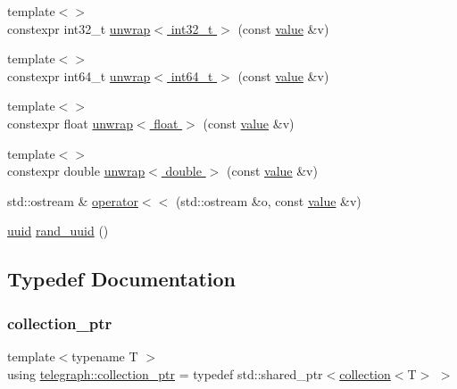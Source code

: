 \begin{DoxyCompactItemize}
\item 
{\footnotesize template$<$$>$ }\\constexpr int32\+\_\+t \hyperlink{namespacetelegraph_adbd7808475a7100a0b36ac829ffed4bf}{unwrap$<$ int32\+\_\+t $>$} (const \hyperlink{classtelegraph_1_1value}{value} \&v)
\item 
{\footnotesize template$<$$>$ }\\constexpr int64\+\_\+t \hyperlink{namespacetelegraph_abd6af2f3c5810ce849af3b37bbf8287a}{unwrap$<$ int64\+\_\+t $>$} (const \hyperlink{classtelegraph_1_1value}{value} \&v)
\item 
{\footnotesize template$<$$>$ }\\constexpr float \hyperlink{namespacetelegraph_afb450fb07065bff298f2304d9cf5c087}{unwrap$<$ float $>$} (const \hyperlink{classtelegraph_1_1value}{value} \&v)
\item 
{\footnotesize template$<$$>$ }\\constexpr double \hyperlink{namespacetelegraph_a714db222bc5b74579bd2d0c5dbd0e6d1}{unwrap$<$ double $>$} (const \hyperlink{classtelegraph_1_1value}{value} \&v)
\item 
std\+::ostream \& \hyperlink{namespacetelegraph_af98f82e1c03798a66c7905e7ae17c5c0}{operator$<$$<$} (std\+::ostream \&o, const \hyperlink{classtelegraph_1_1value}{value} \&v)
\item 
\hyperlink{namespacetelegraph_a51ee91d7eaeef067f7ccac2b170e5d59}{uuid} \hyperlink{namespacetelegraph_aba245ee65da02fc6a1ff4b055d460598}{rand\+\_\+uuid} ()
\end{DoxyCompactItemize}


\subsection{Typedef Documentation}
\mbox{\label{namespacetelegraph_a4fa3678b3fd260dc79a98bea50d582fd}} 
\subsubsection{\texorpdfstring{collection\+\_\+ptr}{collection\_ptr}}
{\footnotesize\ttfamily template$<$typename T $>$ \\
using \hyperlink{namespacetelegraph_a4fa3678b3fd260dc79a98bea50d582fd}{telegraph\+::collection\+\_\+ptr} = typedef std\+::shared\+\_\+ptr$<$\hyperlink{classtelegraph_1_1collection}{collection}$<$T$>$ $>$}

